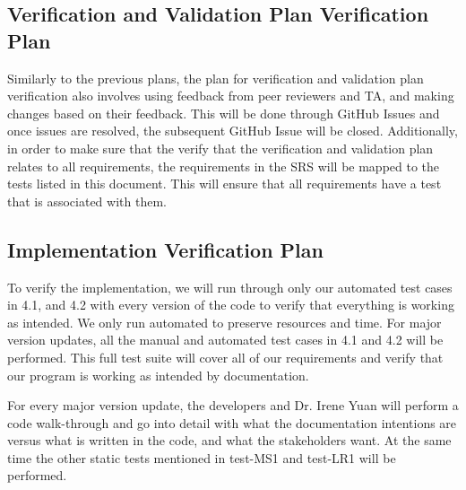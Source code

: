 \documentclass[12pt, titlepage]{article}
\begin{document}
\subsection{Verification and Validation Plan Verification Plan}



Similarly to the previous plans, the plan for verification and validation plan verification also involves using feedback from peer reviewers and TA, and making changes based on their feedback. This will be done through GitHub Issues and once issues are resolved, the subsequent GitHub Issue will be closed. Additionally, in order to make sure that the verify that the verification and validation plan relates to all requirements, the requirements in the SRS will be mapped to the tests listed in this document. This will ensure that all requirements have a test that is associated with them.

\subsection{Implementation Verification Plan}

To verify the implementation, we will run through only our automated test cases in 4.1, and 4.2 with every version of the code to verify that everything is working as intended. We only run automated to preserve resources and time. For major version updates, all the manual and automated test cases in 4.1 and 4.2 will be performed. This full test suite will cover all of our requirements and verify that our program is working as intended by documentation. 

For every major version update, the developers and Dr. Irene Yuan will perform a code walk-through and go into detail with what the documentation intentions are versus what is written in the code, and what the stakeholders want. At the same time the other static tests mentioned in test-MS1 and test-LR1 will be performed.

\end{document}
